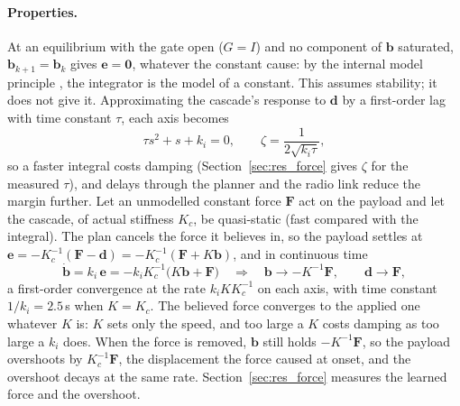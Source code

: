 \paragraph{Properties.} At an equilibrium with the gate open ($G = I$) and no component of $\mathbf{b}$
saturated, $\mathbf{b}_{k+1} = \mathbf{b}_k$ gives $\mathbf{e} = \mathbf{0}$, whatever the constant cause:
by the internal model principle \cite{francis1976internal}, the integrator is the model of a constant.
This assumes stability; it does not give it. Approximating the cascade's response to $\mathbf{d}$ by a
first-order lag with time constant $\tau$, each axis becomes
\begin{equation}
    \tau s^2 + s + k_i = 0, \qquad \zeta = \frac{1}{2\sqrt{k_i \tau}},
\end{equation}
so a faster integral costs damping (Section~\ref{sec:res_force} gives $\zeta$ for the measured $\tau$), and
delays through the planner and the radio link reduce the margin further. Let an unmodelled constant force
$\mathbf{F}$ act on the payload and let the cascade, of actual stiffness $K_c$, be quasi-static (fast
compared with the integral). The plan cancels the force it believes in, so the payload settles at
$\mathbf{e} = -K_c^{-1}(\mathbf{F} - \mathbf{d}) = -K_c^{-1}(\mathbf{F} + K\mathbf{b})$, and in continuous time
\begin{equation}
    \dot{\mathbf{b}} = k_i\,\mathbf{e} = -k_i K_c^{-1}\big(K\mathbf{b} + \mathbf{F}\big)
    \quad\Rightarrow\quad \mathbf{b} \to -K^{-1}\mathbf{F}, \qquad \mathbf{d} \to \mathbf{F},
\end{equation}
a first-order convergence at the rate $k_i K K_c^{-1}$ on each axis, with time constant $1/k_i = 2.5$\,s when
$K = K_c$. The believed force converges to the applied one whatever $K$ is: $K$ sets only the speed, and
too large a $K$ costs damping as too large a $k_i$ does. When the force is removed, $\mathbf{b}$ still holds
$-K^{-1}\mathbf{F}$, so the payload overshoots by $K_c^{-1}\mathbf{F}$, the displacement the force caused at
onset, and the overshoot decays at the same rate. Section~\ref{sec:res_force} measures the learned force and
the overshoot.

